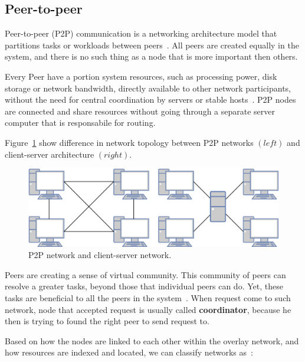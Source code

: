 \subsection{Peer-to-peer}\label{sec:p2p_networks}
%
Peer-to-peer (P2P) communication is a networking architecture model that partitions tasks or workloads between peers~\cite{Schollmeier01}. All peers are created equally in the system, and there is no such thing as a node that is more important then others. 

Every Peer have a portion system resources, such as processing power, disk storage or network bandwidth, directly available to other network participants, without the need for central coordination by servers or stable hosts~\cite{Schollmeier01}. P2P nodes are connected and share resources without going through a separate server computer that is responsabile for routing. 

Figure~\ref{fig:fig2} show difference in network topology between P2P networks $(left)$ and client-server architecture $(right)$.

\begin{figure}[H]
	\begin{center}
		\includegraphics[scale=0.7]{images/Figure2.png}
	\end{center}
	\vspace{-0.6cm}
	\caption{P2P network and client-server network.}
	\label{fig:fig2}
\end{figure}

Peers are creating a sense of virtual community. This community of peers can resolve a greater tasks, beyond those that individual peers can do. Yet, these tasks are beneficial to all the peers in the system~\cite{BandaraJ13}. When request come to such network, node that accepted request is usually called \textbf{coordinator}, because he then is trying to found the right peer to send request to.

Based on how the nodes are linked to each other within the overlay network, and how resources are indexed and located, we can classify networks as~\cite{KamelSE07}:

